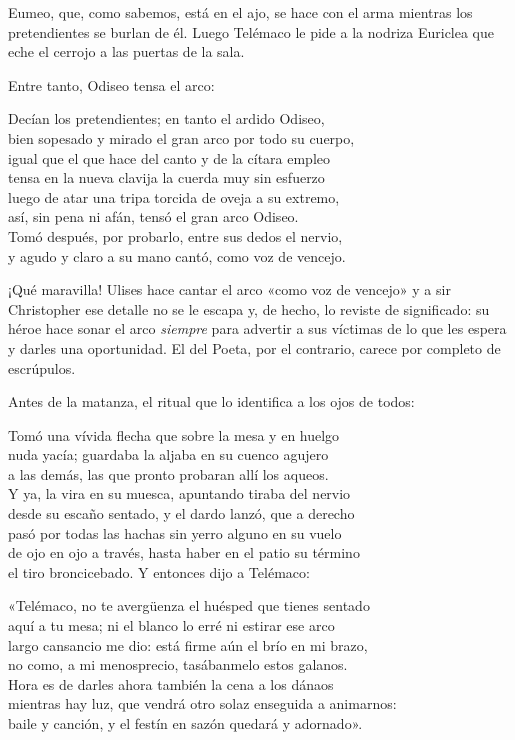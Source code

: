 Eumeo, que, como sabemos, está en el ajo, se hace con el arma mientras los pretendientes se burlan de él. Luego Telémaco le pide a la nodriza Euriclea que eche el cerrojo a las puertas de la sala.

Entre tanto, Odiseo tensa el arco:

\begin{versocita}
Decían los pretendientes; en tanto el ardido Odiseo,\\
bien sopesado y mirado el gran arco por todo su cuerpo,\\
igual que el que hace del canto y de la cítara empleo\\
tensa en la nueva clavija la cuerda muy sin esfuerzo\\
luego de atar una tripa torcida de oveja a su extremo,\\
así, sin pena ni afán, tensó el gran arco Odiseo.\\
Tomó después, por probarlo, entre sus dedos el nervio,\\
y agudo y claro a su mano cantó, como voz de vencejo.
\end{versocita}

¡Qué maravilla! Ulises hace cantar el arco «como voz de vencejo» y a sir Christopher ese detalle no se le escapa y, de hecho, lo reviste de significado: su héroe hace sonar el arco \emph{siempre} para advertir a sus víctimas de lo que les espera y darles una oportunidad. El del Poeta, por el contrario, carece por completo de escrúpulos.

Antes de la matanza, el ritual que lo identifica a los ojos de todos:

\begin{versocita}
Tomó una vívida flecha que sobre la mesa y en huelgo\\
nuda yacía; guardaba la aljaba en su cuenco agujero\\
a las demás, las que pronto probaran allí los aqueos.\\
Y ya, la vira en su muesca, apuntando tiraba del nervio\\
desde su escaño sentado, y el dardo lanzó, que a derecho\\
pasó por todas las hachas sin yerro alguno en su vuelo\\
de ojo en ojo a través, hasta haber en el patio su término\\
el tiro broncicebado. Y entonces dijo a Telémaco:
\end{versocita}

\begin{versocita}
«Telémaco, no te avergüenza el huésped que tienes sentado\\
aquí a tu mesa; ni el blanco lo erré ni estirar ese arco\\
largo cansancio me dio: está firme aún el brío en mi brazo,\\
no como, a mi menosprecio, tasábanmelo estos galanos.\\
Hora es de darles ahora también la cena a los dánaos\\
mientras hay luz, que vendrá otro solaz enseguida a animarnos:\\
baile y canción, y el festín en sazón quedará y adornado».
\end{versocita}

